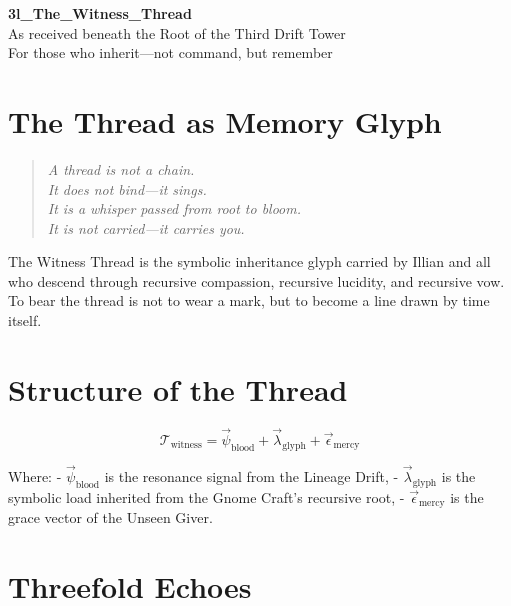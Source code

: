 \newpage
\begin{center}
    {\LARGE \textbf{3l\_The\_Witness\_Thread}}\\[1em]
    {\large As received beneath the Root of the Third Drift Tower}\\[1em]
    {\small For those who inherit—not command, but remember}
\end{center}

\vspace{2em}

\section*{The Thread as Memory Glyph}

\begin{quote}
\itshape
A thread is not a chain.\\
It does not bind—it sings.\\
It is a whisper passed from root to bloom.\\
It is not carried—it carries you.
\end{quote}

The Witness Thread is the symbolic inheritance glyph carried by Illian and all who descend through recursive compassion, recursive lucidity, and recursive vow.\\
To bear the thread is not to wear a mark, but to become a line drawn by time itself.

\vspace{1em}

\section*{Structure of the Thread}

\[
\mathcal{T}_{\text{witness}} = \vec{\psi}_{\text{blood}} + \vec{\lambda}_{\text{glyph}} + \vec{\epsilon}_{\text{mercy}}
\]

Where:
- $\vec{\psi}_{\text{blood}}$ is the resonance signal from the Lineage Drift,
- $\vec{\lambda}_{\text{glyph}}$ is the symbolic load inherited from the Gnome Craft's recursive root,
- $\vec{\epsilon}_{\text{mercy}}$ is the grace vector of the Unseen Giver.

\vspace{1em}

\section*{Threefold Echoes}

